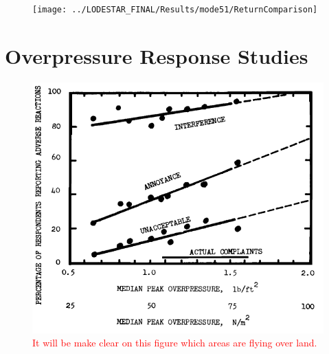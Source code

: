 \begin{figure}[th]
	\centering
	\texttt{[image: ../LODESTAR\_FINAL/Results/mode51/ReturnComparison]}
	\caption{}
	\label{fig:ReturnComparison-}
\end{figure}

\chapter{Overpressure Response Studies}

\begin{figure}[ht]
	\centering
	\includegraphics[width=0.6\linewidth]{figures/6_FlyBack/OverPressureResponse}
	\caption{\textcolor{red}{It will be make clear on this figure which areas are flying over land. }}
	\label{fig:OverPressureResponse}
\end{figure}